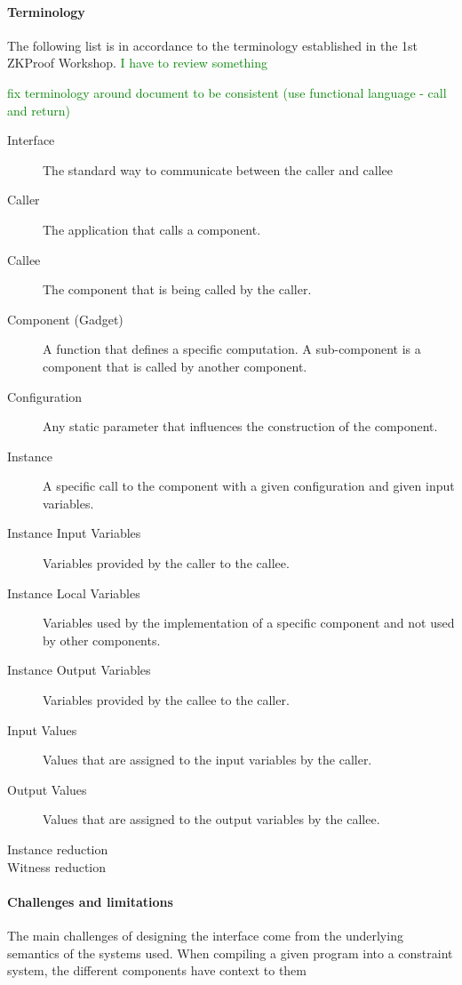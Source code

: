 \documentclass[a4paper,11pt]{article}
\newcommand\anote[1]{\textcolor{green}{#1}}
\begin{document}
		
		\paragraph{Terminology}
		The following list is in accordance to the terminology established in the 1st ZKProof Workshop. \anote{I have to review something}
		
		\anote{fix terminology around document to be consistent (use functional language - call and return)}
		
		\begin{description}
			\item [Interface] The standard way to communicate between the caller and callee
			\item [Caller] The application that calls a component. 
			\item [Callee] The component that is being called by the caller.
			\item [Component (Gadget)] A function that defines a specific computation. A sub-component is a component that is called by another component.
			\item [Configuration] Any static parameter that influences the construction of the component. 
			\item [Instance] A specific call to the component with a given configuration and given input variables.
			\item [Instance Input Variables] Variables provided by the caller to the callee.
			\item [Instance Local Variables] Variables used by the implementation of a specific component and not used by other components.
			\item [Instance Output Variables] Variables provided by the callee to the caller.
			\item [Input Values] Values that are assigned to the input variables by the caller.
			\item [Output Values] Values that are assigned to the output variables by the callee.
			\item [Instance reduction]
			\item [Witness reduction]
		\end{description}
		
		
		\paragraph{Challenges and limitations}
		
		The main challenges of designing the interface come from the underlying semantics of the systems used. When compiling a given program into a constraint system, the different components have context to them
		
\end{document}
